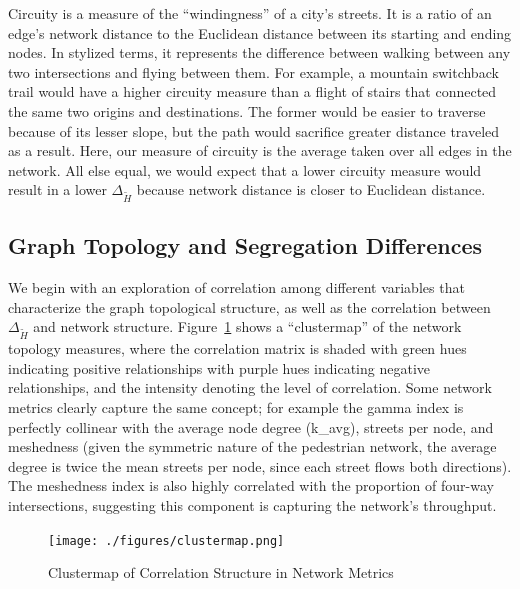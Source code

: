 \documentclass[
  10pt,
]{article}
\begin{document}
Circuity is a measure of the ``windingness'' of a city's streets. It is
a ratio of an edge's network distance to the Euclidean distance between
its starting and ending nodes. In stylized terms, it represents the
difference between walking between any two intersections and flying
between them. For example, a mountain switchback trail would have a
higher circuity measure than a flight of stairs that connected the same
two origins and destinations. The former would be easier to traverse
because of its lesser slope, but the path would sacrifice greater
distance traveled as a result. Here, our measure of circuity is the
average taken over all edges in the network. All else equal, we would
expect that a lower circuity measure would result in a lower
\(\Delta_{\tilde{H}}\) because network distance is closer to Euclidean
distance.

\hypertarget{graph-topology-and-segregation-differences}{%
\subsection{Graph Topology and Segregation
Differences}\label{graph-topology-and-segregation-differences}}

We begin with an exploration of correlation among different variables
that characterize the graph topological structure, as well as the
correlation between \(\Delta_{\tilde{H}}\) and network structure.
Figure~\ref{fig:heatmap} shows a ``clustermap'' of the network topology
measures, where the correlation matrix is shaded with green hues
indicating positive relationships with purple hues indicating negative
relationships, and the intensity denoting the level of correlation. Some
network metrics clearly capture the same concept; for example the gamma
index is perfectly collinear with the average node degree (k\_avg),
streets per node, and meshedness (given the symmetric nature of the
pedestrian network, the average degree is twice the mean streets per
node, since each street flows both directions). The meshedness index is
also highly correlated with the proportion of four-way intersections,
suggesting this component is capturing the network's throughput.

\begin{figure}
\hypertarget{fig:heatmap}{%
\centering
\texttt{[image: ./figures/clustermap.png]}
\caption{Clustermap of Correlation Structure in Network
Metrics}\label{fig:heatmap}
}
\end{figure}
\end{document}
